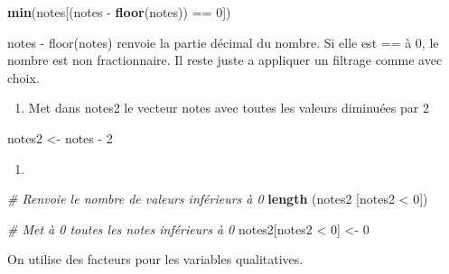 \documentclass[
]{article}
\newenvironment{Shaded}{}{}
\newcommand{\CommentTok}[1]{\textcolor[rgb]{0.38,0.63,0.69}{\textit{#1}}}
\newcommand{\DecValTok}[1]{\textcolor[rgb]{0.25,0.63,0.44}{#1}}
\newcommand{\KeywordTok}[1]{\textcolor[rgb]{0.00,0.44,0.13}{\textbf{#1}}}
\newcommand{\NormalTok}[1]{#1}
\newcommand{\OperatorTok}[1]{\textcolor[rgb]{0.40,0.40,0.40}{#1}}
\newcommand{\StringTok}[1]{\textcolor[rgb]{0.25,0.44,0.63}{#1}}
\providecommand{\tightlist}{%
  \setlength{\itemsep}{0pt}\setlength{\parskip}{0pt}}
\begin{document}
\begin{Shaded}
\begin{Highlighting}[]
\KeywordTok{min}\NormalTok{(notes[(notes }\OperatorTok{{-}}\StringTok{ }\KeywordTok{floor}\NormalTok{(notes)) }\OperatorTok{==}\StringTok{ }\DecValTok{0}\NormalTok{])}
\end{Highlighting}
\end{Shaded}

notes - floor(notes) renvoie la partie décimal du nombre. Si elle est ==
à 0, le nombre est non fractionnaire. Il reste juste a appliquer un
filtrage comme avec choix.

\begin{enumerate}
\def\labelenumi{\arabic{enumi}.}
\setcounter{enumi}{7}
\tightlist
\item
  Met dans notes2 le vecteur notes avec toutes les valeurs diminuées par
  2
\end{enumerate}

\begin{Shaded}
\begin{Highlighting}[]
\NormalTok{notes2 \textless{}{-}}\StringTok{ }\NormalTok{notes }\OperatorTok{{-}}\StringTok{ }\DecValTok{2} 
\end{Highlighting}
\end{Shaded}

\begin{enumerate}
\def\labelenumi{\arabic{enumi}.}
\setcounter{enumi}{8}
\tightlist
\item
\end{enumerate}

\begin{Shaded}
\begin{Highlighting}[]
\CommentTok{\# Renvoie le nombre de valeurs inférieurs à 0}
\KeywordTok{length}\NormalTok{ (notes2 [notes2 }\OperatorTok{\textless{}}\StringTok{ }\DecValTok{0}\NormalTok{])}

\CommentTok{\# Met à 0 toutes les notes inférieurs à 0}
\NormalTok{notes2[notes2 }\OperatorTok{\textless{}}\StringTok{ }\DecValTok{0}\NormalTok{] \textless{}{-}}\StringTok{ }\DecValTok{0}
\end{Highlighting}
\end{Shaded}

On utilise des facteurs pour les variables qualitatives.
\end{document}

